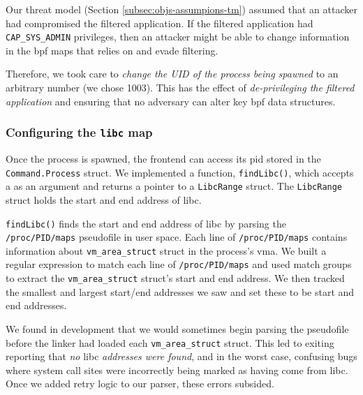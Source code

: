 Our threat model (Section \ref{subsec:objs-assumpions-tm}) assumed that an attacker
had compromised the filtered application. If the filtered application had
\texttt{CAP\_SYS\_ADMIN} privileges, then an attacker might be able to change
information in the \ac{bpf} maps that \af relies on and evade filtering. 

Therefore, we took care to \textit{change the UID of the process being spawned}
to an arbitrary number (we chose 1003). This has the effect of
\textit{de-privileging the filtered application} and ensuring that no adversary
can alter key \ac{bpf} data structures.


\subsubsection{Configuring the \texttt{libc} map}
Once the process is spawned, the frontend can access its \ac{pid} stored in the
\texttt{Command.Process} struct. We implemented a function, 
\texttt{findLibc()}, which accepts a  as an argument and returns a pointer to 
a \texttt{LibcRange}  struct. The \texttt{LibcRange} struct holds the start and end 
address of \ac{libc}.

\texttt{findLibc()} finds the start and end address of \ac{libc} by parsing the
\texttt{/proc/PID/maps} pseudofile in user space. Each line of \texttt{/proc/PID/maps}
contains information about \texttt{vm\_area\_struct} struct in the process's \ac{vma}. We
built a regular expression to match each line of \texttt{/proc/PID/maps} and
used match groups to extract the \texttt{vm\_area\_struct} struct's start and end address.
We then tracked the smallest and largest start/end addresses we saw 
and set these to be  start and end addresses.

We found in development that we would sometimes begin parsing the pseudofile
before the linker had loaded each \texttt{vm\_area\_struct} struct. This led to
\af exiting reporting that \textit{no} \ac{libc} \textit{addresses were found}, and in
the worst case, confusing bugs where system call sites were incorrectly being marked as 
having come from \ac{libc}. Once we added retry logic to our parser, these 
errors subsided.


